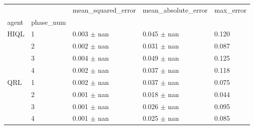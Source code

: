 \begin{tabular}{lllll}
\toprule
 &  & mean_squared_error & mean_absolute_error & max_error \\
agent & phase_num &  &  &  \\
\midrule
\multirow[t]{4}{*}{HIQL} & 1 & 0.003 $\pm$ nan & 0.045 $\pm$ nan & 0.120 \\
 & 2 & 0.002 $\pm$ nan & 0.031 $\pm$ nan & 0.087 \\
 & 3 & 0.004 $\pm$ nan & 0.049 $\pm$ nan & 0.125 \\
 & 4 & 0.002 $\pm$ nan & 0.037 $\pm$ nan & 0.118 \\
\cline{1-5}
\multirow[t]{4}{*}{QRL} & 1 & 0.002 $\pm$ nan & 0.037 $\pm$ nan & 0.075 \\
 & 2 & 0.001 $\pm$ nan & 0.018 $\pm$ nan & 0.044 \\
 & 3 & 0.001 $\pm$ nan & 0.026 $\pm$ nan & 0.095 \\
 & 4 & 0.001 $\pm$ nan & 0.025 $\pm$ nan & 0.085 \\
\cline{1-5}
\bottomrule
\end{tabular}
